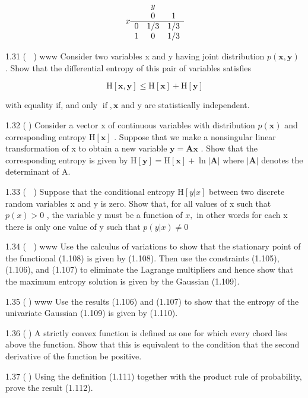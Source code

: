 \documentclass[
  10
]{article}
\begin{document}
\[
x \begin{array}{c c c} & y \\ & 0 & 1 \\ \hline 0 & 1 / 3 & 1 / 3 \\ 1 & 0 & 1 / 3 \end{array}
\]

1.31 ( ) www Consider two variables x and y having joint distribution
\(p ( \mathbf x , \mathbf y )\) . Show that the differential entropy of
this pair of variables satisfies

\[
\mathrm{H} [ \mathbf {x}, \mathbf {y} ] \leqslant \mathrm{H} [ \mathbf {x} ] + \mathrm{H} [ \mathbf {y} ]\tag{1.152}
\]

with equality if, and only \(\operatorname { i f } , \mathbf { x }\) and
y are statistically independent.

1.32 () Consider a vector x of continuous variables with distribution
\(p ( \mathbf { x } )\) and corresponding entropy
\(\mathrm { H } [ \mathbf { x } ]\) . Suppose that we make a nonsingular
linear transformation of x to obtain a new variable
\(\mathbf { y } = \mathbf { A x }\) . Show that the corresponding
entropy is given by
\(\mathrm { H } [ \mathbf { y } ] = \mathrm { H } [ \mathbf { x } ] + \ln { | \mathbf { A } | }\)
where \(| \mathbf { A } |\) denotes the determinant of A.

1.33 ( ) Suppose that the conditional entropy
\(\mathrm { H } [ y | x ]\) between two discrete random variables x and
y is zero. Show that, for all values of x such that \(p ( x ) > 0\) ,
the variable y must be a function of \(x ,\) in other words for each x
there is only one value of y such that \(p ( y | x ) \neq 0\)

1.34 ( ) www Use the calculus of variations to show that the stationary
point of the functional (1.108) is given by (1.108). Then use the
constraints (1.105), (1.106), and (1.107) to eliminate the Lagrange
multipliers and hence show that the maximum entropy solution is given by
the Gaussian (1.109).

1.35 () www Use the results (1.106) and (1.107) to show that the entropy
of the univariate Gaussian (1.109) is given by (1.110).

1.36 () A strictly convex function is defined as one for which every
chord lies above the function. Show that this is equivalent to the
condition that the second derivative of the function be positive.

1.37 () Using the definition (1.111) together with the product rule of
probability, prove the result (1.112).
\end{document}
